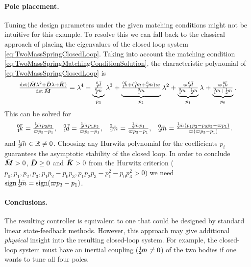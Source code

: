 \paragraph{Pole placement.}
Tuning the design parameters under the given matching conditions might not be intuitive for this example.
To resolve this we can fall back to the classical approach of placing the eigenvalues of the closed loop system \eqref{eq:TwoMassSpringClosedLoop}.
Taking into account the matching condition \eqref{eq:TwoMassSpringMatchingConditionSolution}, the characteristic polynomial of \eqref{eq:TwoMassSpringClosedLoop} is
\begin{align}
 \tfrac{\det (\sysInertiaMatC \EigenVal^2 + \sysDissMatC \EigenVal + \sysStiffMatC)}{\det \sysInertiaMatC}
 =
 \EigenVal^4 
 + \underbrace{\tfrac{\bodyDampingC{0}{1}}{\bodyMassC{0}{1}}}_{p_3} \EigenVal^3
 + \underbrace{\tfrac{\bodyStiffnessC{0}{1} + (\bodyMassC{0}{1}+\bodyMassC{0}{2})\varpi}{\bodyMassC{0}{1}}}_{p_2} \EigenVal^2
 + \underbrace{\tfrac{\varpi \bodyDampingC{0}{1}}{\bodyMassC{0}{1}+\bodyMassC{1}{2}}}_{p_1} \EigenVal
 + \underbrace{\tfrac{\varpi \bodyStiffnessC{0}{1}}{\bodyMassC{0}{1}+\bodyMassC{1}{2}}}_{p_0}
 .
\end{align}
This can be solved for
\begin{subequations}
\begin{align}
 \bodyStiffnessC{0}{1}  &= \tfrac{\bodyMassC{1}{2} p_0 p_3}{\varpi p_3 - p_1},&
 \bodyDampingC{0}{1}    &= \tfrac{\bodyMassC{1}{2} p_1 p_3}{\varpi p_3 - p_1},&
 \bodyMassC{0}{1}       &= \tfrac{\bodyMassC{1}{2} p_1}{\varpi p_3 - p_1},&
 \bodyMassC{0}{2}       &= \tfrac{\bodyMassC{1}{2} (p_1 p_2 - p_0 p_3 - \varpi p_1)}{\varpi(\varpi p_3 - p_1)}
 .
\end{align}
\end{subequations}
and $\bodyMassC{1}{2} \in \RealNum \neq 0$.
Choosing any Hurwitz polynomial for the coefficients $p_i$ guarantees the asymptotic stability of the closed loop.
In order to conclude $\bar{\boldsymbol{M}} > 0$, $\bar{\boldsymbol{D}} \geq 0$ and $\bar{\boldsymbol{K}} > 0$ from the Hurwitz criterion ($p_0, p_1, p_2, p_3, p_1 p_2 - p_0 p_3, p_1 p_2 p_3 - p_1^2 - p_0 p_3^2 > 0$) we need $\sign \bodyMassC{1}{2} = \sign (\varpi p_3 - p_1)$.

\paragraph{Conclusions.}
The resulting controller is equivalent to one that could be designed by standard linear state-feedback methods.
However, this approach may give additional \textit{physical} insight into the resulting closed-loop system.
For example, the closed-loop system must have an inertial coupling ($\bodyMassC{1}{2} \neq 0$) of the two bodies if one wants to tune all four poles.
